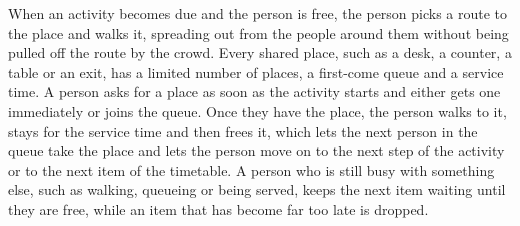 When an activity becomes due and the person is free, the person picks a route to the place and walks it, spreading out from the people around them without being pulled off the route by the crowd. Every shared place, such as a desk, a counter, a table or an exit, has a limited number of places, a first-come queue and a service time. A person asks for a place as soon as the activity starts and either gets one immediately or joins the queue. Once they have the place, the person walks to it, stays for the service time and then frees it, which lets the next person in the queue take the place and lets the person move on to the next step of the activity or to the next item of the timetable. A person who is still busy with something else, such as walking, queueing or being served, keeps the next item waiting until they are free, while an item that has become far too late is dropped.

